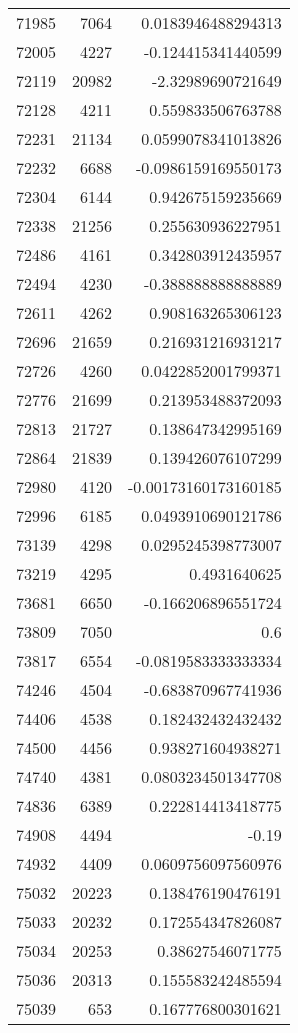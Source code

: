\begin{tabular}{r | r | r}
71985 & 7064 & 0.0183946488294313 \\
72005 & 4227 & -0.124415341440599 \\
72119 & 20982 & -2.32989690721649 \\
72128 & 4211 & 0.559833506763788 \\
72231 & 21134 & 0.0599078341013826 \\
72232 & 6688 & -0.0986159169550173 \\
72304 & 6144 & 0.942675159235669 \\
72338 & 21256 & 0.255630936227951 \\
72486 & 4161 & 0.342803912435957 \\
72494 & 4230 & -0.388888888888889 \\
72611 & 4262 & 0.908163265306123 \\
72696 & 21659 & 0.216931216931217 \\
72726 & 4260 & 0.0422852001799371 \\
72776 & 21699 & 0.213953488372093 \\
72813 & 21727 & 0.138647342995169 \\
72864 & 21839 & 0.139426076107299 \\
72980 & 4120 & -0.00173160173160185 \\
72996 & 6185 & 0.0493910690121786 \\
73139 & 4298 & 0.0295245398773007 \\
73219 & 4295 & 0.4931640625 \\
73681 & 6650 & -0.166206896551724 \\
73809 & 7050 & 0.6 \\
73817 & 6554 & -0.0819583333333334 \\
74246 & 4504 & -0.683870967741936 \\
74406 & 4538 & 0.182432432432432 \\
74500 & 4456 & 0.938271604938271 \\
74740 & 4381 & 0.0803234501347708 \\
74836 & 6389 & 0.222814413418775 \\
74908 & 4494 & -0.19 \\
74932 & 4409 & 0.0609756097560976 \\
75032 & 20223 & 0.138476190476191 \\
75033 & 20232 & 0.172554347826087 \\
75034 & 20253 & 0.38627546071775 \\
75036 & 20313 & 0.155583242485594 \\
75039 & 653 & 0.167776800301621 \\

\end{tabular}
